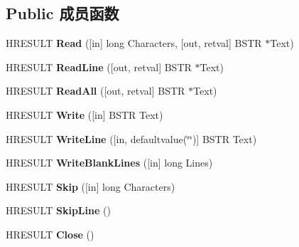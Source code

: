 \subsection*{Public 成员函数}
\begin{DoxyCompactItemize}
\item 
\mbox{\label{interface_i_wsh_runtime_library_1_1_i_text_stream_a3579b088f6d033ce251b5da5fd5230fd}} 
H\+R\+E\+S\+U\+LT {\bfseries Read} (\mbox{[}in\mbox{]} long Characters, \mbox{[}out, retval\mbox{]} B\+S\+TR $\ast$Text)
\item 
\mbox{\label{interface_i_wsh_runtime_library_1_1_i_text_stream_a2a413cc46cede96cff3188f9d5da02f0}} 
H\+R\+E\+S\+U\+LT {\bfseries Read\+Line} (\mbox{[}out, retval\mbox{]} B\+S\+TR $\ast$Text)
\item 
\mbox{\label{interface_i_wsh_runtime_library_1_1_i_text_stream_a2855e2acceca53f027a4ac6d12b3a776}} 
H\+R\+E\+S\+U\+LT {\bfseries Read\+All} (\mbox{[}out, retval\mbox{]} B\+S\+TR $\ast$Text)
\item 
\mbox{\label{interface_i_wsh_runtime_library_1_1_i_text_stream_a0e8a0c4410845fe7d25e606c3aa977e3}} 
H\+R\+E\+S\+U\+LT {\bfseries Write} (\mbox{[}in\mbox{]} B\+S\+TR Text)
\item 
\mbox{\label{interface_i_wsh_runtime_library_1_1_i_text_stream_a8c7ffe0e0aafdd0ef48e40ceaf1182f5}} 
H\+R\+E\+S\+U\+LT {\bfseries Write\+Line} (\mbox{[}in, defaultvalue(\char`\"{}\char`\"{})\mbox{]} B\+S\+TR Text)
\item 
\mbox{\label{interface_i_wsh_runtime_library_1_1_i_text_stream_a1571cc134651599a5a0b7a61721cceed}} 
H\+R\+E\+S\+U\+LT {\bfseries Write\+Blank\+Lines} (\mbox{[}in\mbox{]} long Lines)
\item 
\mbox{\label{interface_i_wsh_runtime_library_1_1_i_text_stream_afa13c2aaa466602ef1e320d85c4f471e}} 
H\+R\+E\+S\+U\+LT {\bfseries Skip} (\mbox{[}in\mbox{]} long Characters)
\item 
\mbox{\label{interface_i_wsh_runtime_library_1_1_i_text_stream_a170bf6168747c4e3a0551561e20a4943}} 
H\+R\+E\+S\+U\+LT {\bfseries Skip\+Line} ()
\item 
\mbox{\label{interface_i_wsh_runtime_library_1_1_i_text_stream_ac9ae86fb0a771e191f6be168fe8a5056}} 
H\+R\+E\+S\+U\+LT {\bfseries Close} ()
\end{DoxyCompactItemize}

